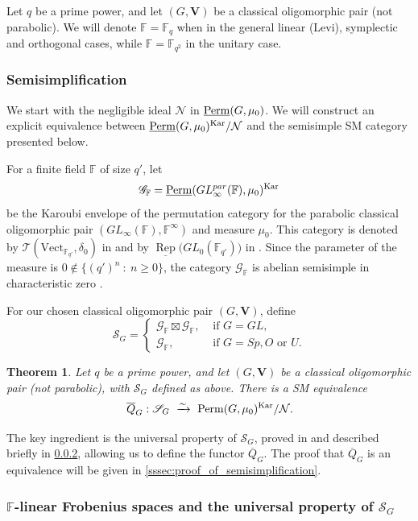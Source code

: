 \documentclass[11pt,a4paper]{amsart}
\theoremstyle{plain}%
\newtheorem{theorem}[lemma]{Theorem}
\theoremstyle{definition}
\theoremstyle{remark}
\newcommand{\V}{\mathbf{V}}
\newcommand{\Perm}{\underline{{\rm Perm}}}
\newcommand{\Rep}{\operatorname{Rep}}
\newcommand{\F}{{\mathbb F}}
\newcommand{\Kar}{\mathrm{Kar}}
\newcommand{\N}{\mathcal N}
\newcommand{\boxt}{\mathbin{\boxtimes}}
\begin{document}
Let $q$ be a prime power, and let $(G, \V)$ be a classical oligomorphic pair (not parabolic).
We will denote $\F=\F_q$ when in the general linear (Levi), symplectic and orthogonal cases, while $\F=\F_{q^2}$ in the unitary case.

\subsubsection{Semisimplification}
We start with the negligible ideal $\mathcal{N}$ in $\Perm(G, \mu_0)$. We will construct an explicit equivalence between $\Perm(G, \mu_0)^{\Kar}/\mathcal{N}$ and the semisimple SM category presented below.


For a finite field $\F$ of size $q'$, let
\[
 \mathscr G_{\F}=\Perm(GL^{par}_{\infty}(\F), \mu_0)^{\Kar}
\]
be the Karoubi envelope of the permutation category for the parabolic classical oligomorphic pair 
$ (GL_{\infty}(\F), \F^{\infty})$ and measure $\mu_0$. This category is denoted by $\mathcal T(\mathrm{Vect}_{\F_{q'}},\delta_0)$ in \cite{Knop} and by $\underline{\Rep}\bigl(GL_0(\F_{q'})\bigr)$ in \cite{EAHGL}. Since the parameter of the measure is $0\notin\{{(q')}^n~:~n\geq0\}$, the category $\mathscr G_{\F}$ is abelian semisimple in characteristic zero \cite{Knop, HS-classical}. 


For our chosen classical oligomorphic pair $(G, \V)$, define
\[
 \mathscr S_G=
 \begin{cases}
 \mathscr G_{\F}\boxt\mathscr G_{\F},&\text{ if } G=GL,\\
 \mathscr G_\F,&\text{ if }G=Sp, O \text{ or } U.
 \end{cases}
\]




\begin{theorem}\label{thm:rankzero}
Let $q$ be a prime power, and let $(G, \V)$ be a classical oligomorphic pair (not parabolic){,} with $ \mathscr S_G$ defined as above. There is a SM equivalence
\[
 \overline{Q}_G: \mathscr S_G~\xrightarrow{\sim}~\mathcal \Perm(G, \mu_0)^{\Kar}/\N.
\]
\end{theorem}
The key ingredient is the universal property of $\mathscr S_G$, proved in \cite{EAHGL} and described briefly in \cref{sssec:F_q_lin}, allowing us to define the functor $\overline{Q}_G$. The proof that $\overline{Q}_G$ is an equivalence will be given in \cref{sssec:proof_of_semisimplification}. 


\subsubsection{\texorpdfstring{$\F$}{F}-linear Frobenius spaces and the universal property of \texorpdfstring{$\mathscr S_G$}{the category S}}\label{sssec:F_q_lin}
\end{document}
